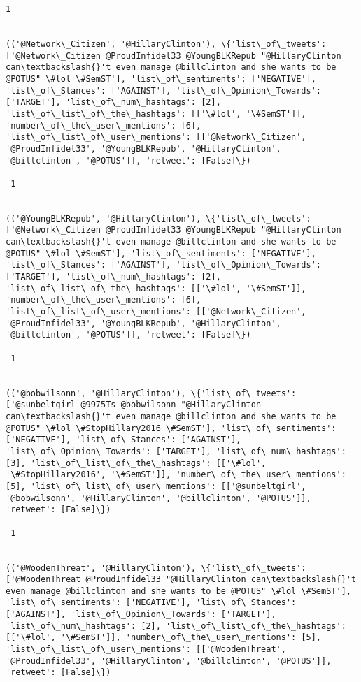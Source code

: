 \documentclass[11pt]{article}
\begin{document}
\begin{Verbatim}[commandchars=\\\{\}]
 1
 

(('@Network\_Citizen', '@HillaryClinton'), \{'list\_of\_tweets': ['@Network\_Citizen @ProudInfidel33 @YoungBLKRepub "@HillaryClinton can\textbackslash{}'t even manage @billclinton and she wants to be @POTUS" \#lol \#SemST'], 'list\_of\_sentiments': ['NEGATIVE'], 'list\_of\_Stances': ['AGAINST'], 'list\_of\_Opinion\_Towards': ['TARGET'], 'list\_of\_num\_hashtags': [2], 'list\_of\_list\_of\_the\_hashtags': [['\#lol', '\#SemST']], 'number\_of\_the\_user\_mentions': [6], 'list\_of\_list\_of\_user\_mentions': [['@Network\_Citizen', '@ProudInfidel33', '@YoungBLKRepub', '@HillaryClinton', '@billclinton', '@POTUS']], 'retweet': [False]\})

 1
 

(('@YoungBLKRepub', '@HillaryClinton'), \{'list\_of\_tweets': ['@Network\_Citizen @ProudInfidel33 @YoungBLKRepub "@HillaryClinton can\textbackslash{}'t even manage @billclinton and she wants to be @POTUS" \#lol \#SemST'], 'list\_of\_sentiments': ['NEGATIVE'], 'list\_of\_Stances': ['AGAINST'], 'list\_of\_Opinion\_Towards': ['TARGET'], 'list\_of\_num\_hashtags': [2], 'list\_of\_list\_of\_the\_hashtags': [['\#lol', '\#SemST']], 'number\_of\_the\_user\_mentions': [6], 'list\_of\_list\_of\_user\_mentions': [['@Network\_Citizen', '@ProudInfidel33', '@YoungBLKRepub', '@HillaryClinton', '@billclinton', '@POTUS']], 'retweet': [False]\})

 1
 

(('@bobwilsonn', '@HillaryClinton'), \{'list\_of\_tweets': ['@sunbeltgirl @9975Ts @bobwilsonn "@HillaryClinton can\textbackslash{}'t even manage @billclinton and she wants to be @POTUS" \#lol \#StopHillary2016 \#SemST'], 'list\_of\_sentiments': ['NEGATIVE'], 'list\_of\_Stances': ['AGAINST'], 'list\_of\_Opinion\_Towards': ['TARGET'], 'list\_of\_num\_hashtags': [3], 'list\_of\_list\_of\_the\_hashtags': [['\#lol', '\#StopHillary2016', '\#SemST']], 'number\_of\_the\_user\_mentions': [5], 'list\_of\_list\_of\_user\_mentions': [['@sunbeltgirl', '@bobwilsonn', '@HillaryClinton', '@billclinton', '@POTUS']], 'retweet': [False]\})

 1
 

(('@WoodenThreat', '@HillaryClinton'), \{'list\_of\_tweets': ['@WoodenThreat @ProudInfidel33 "@HillaryClinton can\textbackslash{}'t even manage @billclinton and she wants to be @POTUS" \#lol \#SemST'], 'list\_of\_sentiments': ['NEGATIVE'], 'list\_of\_Stances': ['AGAINST'], 'list\_of\_Opinion\_Towards': ['TARGET'], 'list\_of\_num\_hashtags': [2], 'list\_of\_list\_of\_the\_hashtags': [['\#lol', '\#SemST']], 'number\_of\_the\_user\_mentions': [5], 'list\_of\_list\_of\_user\_mentions': [['@WoodenThreat', '@ProudInfidel33', '@HillaryClinton', '@billclinton', '@POTUS']], 'retweet': [False]\})


\end{Verbatim}
\end{document}
